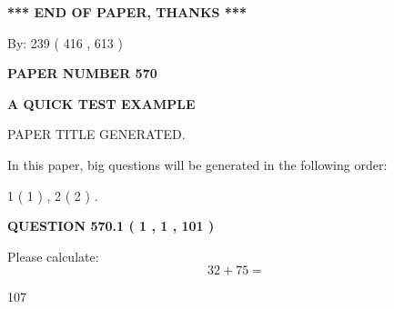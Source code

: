 \documentclass[12pt]{article}
\begin{document}
   
   
   
\vspace{1.0in} 
{\textbf{\large{ *** END OF PAPER, THANKS *** }}} 
   
   
\hspace{1.0in} By: 
 239 ( 416 ,  613 )
   
   
   
   
\newpage 
\setcounter{page}{ 
   570001 } 
   
   
   
   
 {\textbf{ \Large{ PAPER NUMBER  570  }}}
   
   
\vspace{0.2in}
   
   
   
   
   
   
   
   
 \vspace{0.2in}
{\LARGE {\textbf{ A QUICK TEST EXAMPLE}}}
   
   
 PAPER TITLE GENERATED.
   
   
   
\vspace{0.2in}
   
In this paper, big questions will be generated in the following order: 
   
   
   1 ( 1 )
 ,
   2 ( 2 )
 .
  
\vspace{0.2in}
  
{\textbf{\Large{QUESTION
570.1 
 ( 1 , 1 , 101 )
}}}
  
  
 
Please calculate:
\begin{equation}
32 +  %
75 = \nonumber
\end{equation}
 
 
 
\noindent{}
 
 

107
 
 
\noindent{}
 
 

 
 
 
\noindent{}
 
\end{document}
